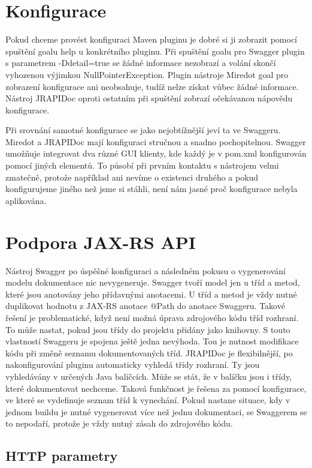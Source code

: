 \documentclass[11pt,twoside,a4paper]{book}
\begin{document}
\section{Konfigurace}

Pokud chceme provést konfiguraci Maven pluginu je dobré si ji zobrazit pomocí spuštění
goalu help u konkrétního pluginu. Při spuštění goalu pro Swagger plugin s parametrem
-Ddetail=true se žádné informace nezobrazí a volání skončí vyhozenou výjimkou
NullPointerException. Plugin nástroje Miredot goal pro zobrazení konfigurace ani
neobsahuje, tudíž nelze získat vůbec žádné informace. Nástroj JRAPIDoc oproti
ostatním při spuštění zobrazí očekávanou nápovědu konfigurace.

Při srovnání samotné konfigurace se jako nejobtížnější jeví ta ve Swaggeru. Miredot a
JRAPIDoc mají konfiguraci stručnou a snadno pochopitelnou. Swagger umožňuje
integrovat dva různé GUI klienty, kde každý je v pom.xml konfigurován pomocí
jiných elementů. To působí při prvním kontaktu s nástrojem velmi zmatečně,
protože například ani nevíme o existenci druhého a pokud konfigurujeme jiného
než jsme si stáhli, není nám jasné proč konfigurace nebyla aplikována.

\section{Podpora JAX-RS API}

Nástroj Swagger po úspěšné konfiguraci a následném pokusu o vygenerování modelu
dokumentace nic nevygeneruje. Swagger tvoří model jen u tříd a metod, které
jsou anotovány jeho přídavnými anotacemi. U tříd a metod je vždy nutné
duplikovat hodnotu z JAX-RS anotace @Path do anotace Swaggeru. Takové řešení je
problematické, když není možná úprava zdrojového kódu tříd rozhraní. To může
nastat, pokud jsou třídy do projektu přidány jako knihovny. S touto vlastností
Swaggeru je spojena ještě jedna nevýhoda. Tou je nutnost modifikace kódu při změně seznamu
dokumentovaných tříd. JRAPIDoc je flexibilnější, po nakonfigurování pluginu automaticky vyhledá třídy rozhraní.
Ty jsou vyhledávány v určených Java balíčcích. Může se stát, že v balíčku jsou i třídy, které
dokumentovat nechceme. Taková funkčnost je řešena za pomocí konfigurace, ve
které se vydefinuje seznam tříd k vynechání. Pokud nastane situace, kdy v jednom
buildu je nutné vygenerovat více než jednu dokumentaci, se Swaggerem se to
nepodaří, protože je vždy nutný zásah do zdrojového kódu.

\subsection{HTTP parametry}
\end{document}

